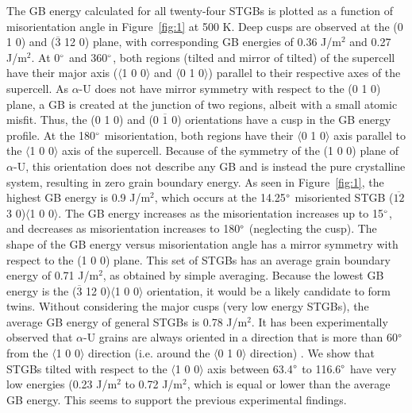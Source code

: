 \documentclass{anstrans}
\begin{document}
The GB energy calculated for all twenty-four STGBs is plotted as a function of misorientation angle in Figure~\ref{fig:1} at 500 K. Deep cusps are observed at the (0 1 0) and ($\overline{3}$ 12 0) plane, with corresponding GB energies of 0.36 J/m${^2}$ and 0.27 J/m${^2}$. At 0$\degree$ and 360$\degree$, both regions (tilted and mirror of tilted) of the supercell have their major axis ($\langle$1 0 0$\rangle$ and $\langle$0 1 0$\rangle$) parallel to their respective axes of the supercell. As $\alpha$-U does not have mirror symmetry with respect to the (0 1 0) plane, a GB is created at the junction of two regions, albeit with a small atomic misfit. Thus, the (0 1 0) and (0 $\overline{1}$ 0) orientations have a cusp in the GB energy profile. At the 180$\degree$ misorientation, both regions have their $\langle$0 1 0$\rangle$ axis parallel to the $\langle$1 0 0$\rangle$ axis of the supercell. Because of the symmetry of the (1 0 0) plane of $\alpha$-U, this orientation does not describe any GB and is instead the pure crystalline system, resulting in zero grain boundary energy. As seen in Figure~\ref{fig:1}, the highest GB energy is 0.9 J/m${^2}$, which occurs at the 14.25$\degree$ misoriented STGB ($\overline{12}$ 3 0)$\langle$1 0 0$\rangle$. The GB energy increases as the misorientation increases up to 15$\degree$, and decreases as misorientation increases to 180$\degree$ (neglecting the cusp). The shape of the GB energy versus misorientation angle has a mirror symmetry with respect to the (1 0 0) plane. This set of STGBs has an average grain boundary energy of 0.71 J/m${^2}$, as obtained by simple averaging. Because the lowest GB energy is the ($\overline{3}$ 12 0)$\langle$1 0 0$\rangle$ orientation, it would be a likely candidate to form twins. Without considering the major cusps (very low energy STGBs), the average GB energy of general STGBs is 0.78 J/m${^2}$. It has been experimentally observed that $\alpha$-U grains are always oriented in a direction that is more than 60$\degree$ from the $\langle$1 0 0$\rangle$ direction (i.e. around the $\langle$0 1 0$\rangle$ direction) \cite{stobo1965}. We show that STGBs tilted with respect to the $\langle$1 0 0$\rangle$ axis between 63.4$\degree$ to 116.6$\degree$ have very low energies (0.23 J/m${^2}$ to 0.72 J/m${^2}$, which is equal or lower than the average GB energy. This seems to support the previous experimental findings. 
\end{document}
